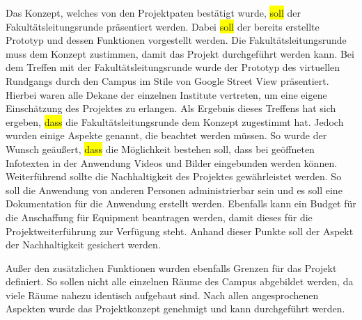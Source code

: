Das Konzept, welches von den Projektpaten bestätigt wurde, \colorbox{yellow}{soll} der Fakultätsleitungsrunde präsentiert werden. Dabei \colorbox{yellow}{soll} 
der bereits erstellte Prototyp und dessen Funktionen vorgestellt werden. Die Fakultätsleitungsrunde muss dem Konzept 
zustimmen, damit das Projekt durchgeführt werden kann.
Bei dem Treffen mit der Fakultätsleitungsrunde wurde der Prototyp des virtuellen Rundgangs durch den Campus im Stile von 
Google Street View präsentiert. Hierbei waren alle Dekane der einzelnen Institute vertreten, um eine eigene Einschätzung 
des Projektes zu erlangen.
Als Ergebnis dieses Treffens hat sich ergeben, \colorbox{yellow}{dass} die Fakultätsleitungsrunde dem Konzept zugestimmt hat. Jedoch wurden 
einige Aspekte genannt, die beachtet werden müssen. So wurde der Wunsch geäußert, \colorbox{yellow}{dass} die Möglichkeit bestehen soll, dass 
bei geöffneten Infotexten in der Anwendung Videos und Bilder eingebunden werden können. Weiterführend sollte die 
Nachhaltigkeit des Projektes gewährleistet werden. So soll die Anwendung von anderen Personen administrierbar sein und es 
soll eine Dokumentation für die Anwendung erstellt werden. Ebenfalls kann ein Budget für die Anschaffung für Equipment 
beantragen werden, damit dieses für die Projektweiterführung zur Verfügung steht. Anhand dieser Punkte soll der Aspekt der 
Nachhaltigkeit gesichert werden. 

Außer den zusätzlichen Funktionen wurden ebenfalls Grenzen für das Projekt definiert. So sollen nicht alle einzelnen Räume 
des Campus abgebildet werden, da viele Räume nahezu identisch aufgebaut sind. 
Nach allen angesprochenen Aspekten wurde das Projektkonzept genehmigt und kann durchgeführt werden.
